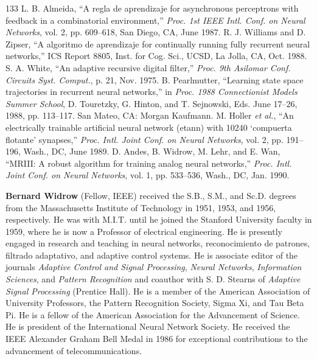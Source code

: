 \documentclass[10pt,twocolumn]{article}
\begin{document}
\begin{thebibliography}{133}
 L. B. Almeida, ``A regla de aprendizaje for asynchronous perceptrons with feedback in a combinatorial environment,'' \textit{Proc. 1st IEEE Intl. Conf. on Neural Networks}, vol. 2, pp. 609--618, San Diego, CA, June 1987.
 R. J. Williams and D. Zipser, ``A algoritmo de aprendizaje for continually running fully recurrent neural networks,'' ICS Report 8805, Inst. for Cog. Sci., UCSD, La Jolla, CA, Oct. 1988.
 S. A. White, ``An adaptive recursive digital filter,'' \textit{Proc. 9th Asilomar Conf. Circuits Syst. Comput.}, p. 21, Nov. 1975.
 B. Pearlmutter, ``Learning state space trajectories in recurrent neural networks,'' in \textit{Proc. 1988 Connectionist Models Summer School}, D. Touretzky, G. Hinton, and T. Sejnowski, Eds. June 17--26, 1988, pp. 113--117. San Mateo, CA: Morgan Kaufmann.
 M. Holler \textit{et al.}, ``An electrically trainable artificial neural network (etann) with 10240 `compuerta flotante' synapses,'' \textit{Proc. Intl. Joint Conf. on Neural Networks}, vol. 2, pp. 191--196, Wash., DC, June 1989.
 D. Andes, B. Widrow, M. Lehr, and E. Wan, ``MRIII: A robust algorithm for training analog neural networks,'' \textit{Proc. Intl. Joint Conf. on Neural Networks}, vol. 1, pp. 533--536, Wash., DC, Jan. 1990.
\end{thebibliography}

\vspace{1em}
\noindent\textbf{Bernard Widrow} (Fellow, IEEE) received the S.B., S.M., and Sc.D.
degrees from the Massachusetts Institute of Technology in 1951, 1953, and 1956,
respectively. He was with M.I.T. until he joined the Stanford University faculty
in 1959, where he is now a Professor of electrical engineering. He is presently
engaged in research and teaching in neural networks, reconocimiento de patrones,
filtrado adaptativo, and adaptive control systems. He is associate editor of the
journals \textit{Adaptive Control and Signal Processing}, \textit{Neural
Networks}, \textit{Information Sciences}, and \textit{Pattern Recognition} and
coauthor with S. D. Stearns of \textit{Adaptive Signal Processing} (Prentice
Hall). He is a member of the American Association of University Professors, the
Pattern Recognition Society, Sigma Xi, and Tau Beta Pi. He is a fellow of the
American Association for the Advancement of Science. He is president of the
International Neural Network Society. He received the IEEE Alexander Graham Bell
Medal in 1986 for exceptional contributions to the advancement of
telecommunications.
\end{document}

